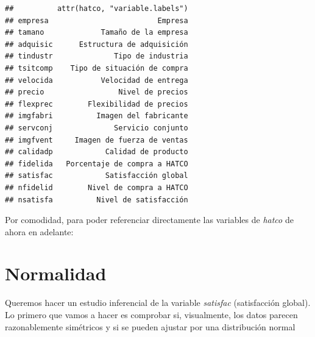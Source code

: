 \documentclass[]{book}
\newenvironment{Shaded}{\begin{snugshade}}{\end{snugshade}}
\newcommand{\KeywordTok}[1]{\textcolor[rgb]{0.13,0.29,0.53}{\textbf{#1}}}
\newcommand{\StringTok}[1]{\textcolor[rgb]{0.31,0.60,0.02}{#1}}
\newcommand{\CommentTok}[1]{\textcolor[rgb]{0.56,0.35,0.01}{\textit{#1}}}
\newcommand{\OperatorTok}[1]{\textcolor[rgb]{0.81,0.36,0.00}{\textbf{#1}}}
\newcommand{\NormalTok}[1]{#1}
\begin{document}
\begin{verbatim}
##          attr(hatco, "variable.labels")
## empresa                         Empresa
## tamano             Tamaño de la empresa
## adquisic      Estructura de adquisición
## tindustr              Tipo de industria
## tsitcomp    Tipo de situación de compra
## velocida           Velocidad de entrega
## precio                 Nivel de precios
## flexprec        Flexibilidad de precios
## imgfabri          Imagen del fabricante
## servconj              Servicio conjunto
## imgfvent     Imagen de fuerza de ventas
## calidadp            Calidad de producto
## fidelida   Porcentaje de compra a HATCO
## satisfac            Satisfacción global
## nfidelid        Nivel de compra a HATCO
## nsatisfa          Nivel de satisfacción
\end{verbatim}

Por comodidad, para poder referenciar directamente las variables de
\emph{hatco} de ahora en adelante:

\begin{Shaded}
\end{Shaded}

\section{Normalidad}\label{normalidad}

Queremos hacer un estudio inferencial de la variable \emph{satisfac}
(satisfacción global). Lo primero que vamos a hacer es comprobar si,
visualmente, los datos parecen razonablemente simétricos y si se pueden
ajustar por una distribución normal

\begin{Shaded}
\end{Shaded}
\end{document}
